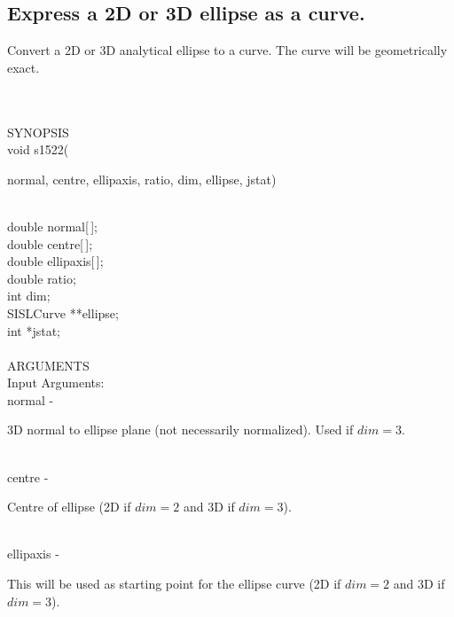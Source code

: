 \subsection{Express a 2D or 3D ellipse as a curve.}
\begin{minipg1}
  Convert a 2D or 3D analytical ellipse to a curve.
  The curve will be geometrically exact.
\end{minipg1} \\ \\
SYNOPSIS\\
        \> void s1522(\begin{minipg3}
            {\fov normal},  {\fov centre},  {\fov ellipaxis},  {\fov ratio},  {\fov dim},  {\fov ellipse},  {\fov jstat})
                \end{minipg3}\\[0.3ex]
                \>\>    double \> {\fov normal}[\,];\\
                \>\>    double \> {\fov centre}[\,];\\
                \>\>    double \> {\fov ellipaxis}[\,];\\
                \>\>    double \> {\fov ratio};\\
                \>\>    int    \> {\fov dim};\\
                \>\>    SISLCurve \> **{\fov ellipse};\\
                \>\>    int    \> *{\fov jstat};\\
\\
ARGUMENTS\\
        \>Input Arguments:\\
        \>\>    {\fov normal} \> - \>
        \begin{minipg2}
          3D normal to ellipse plane (not necessarily normalized).  Used
          if $dim=3$.
        \end{minipg2}\\[0.8ex]
        \>\>    {\fov centre} \> - \>
        \begin{minipg2}
          Centre of ellipse (2D if $dim=2$ and 3D if $dim=3$).
        \end{minipg2}\\[0.8ex]
        \>\>    {\fov ellipaxis} \> - \>
        \begin{minipg2}
          This will be used as starting point
          for the ellipse curve (2D if $dim=2$ and 3D if $dim=3$).
        \end{minipg2}\\[0.8ex]
